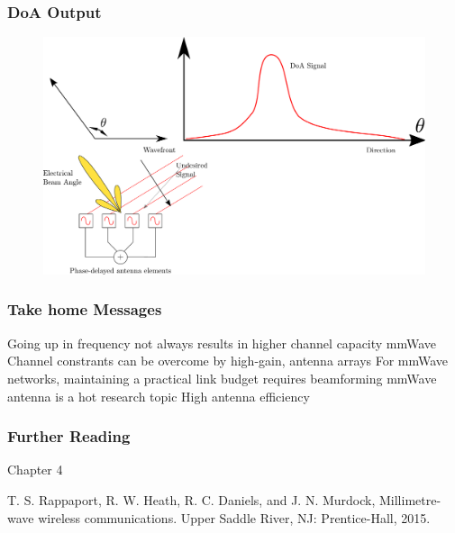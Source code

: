 \documentclass[10pt]{beamer}
\begin{document}
\begin{frame}
    \frametitle{DoA Output}

    \begin{figure}[h!]
        \centering
        \includegraphics[width=.7\textwidth]{DoA.pdf}
    \end{figure}
\end{frame}

\begin{frame}
    \frametitle{Take home Messages}
    \begin{outline}
        \1 Going up in frequency not always results in higher channel capacity
        \1 mmWave Channel constrants can be overcome by high-gain, antenna arrays
        \1 For mmWave networks, maintaining a practical link budget requires beamforming
        \1 mmWave antenna is a hot research topic
        \1 High antenna efficiency
    \end{outline}
\end{frame}

\begin{frame}
    \frametitle{Further Reading}

    Chapter 4

    T. S. Rappaport, R. W. Heath, R. C. Daniels, and J. N. Murdock, Millimetre-wave wireless communications. Upper Saddle River, NJ: Prentice-Hall, 2015.

\end{frame}
\end{document}
